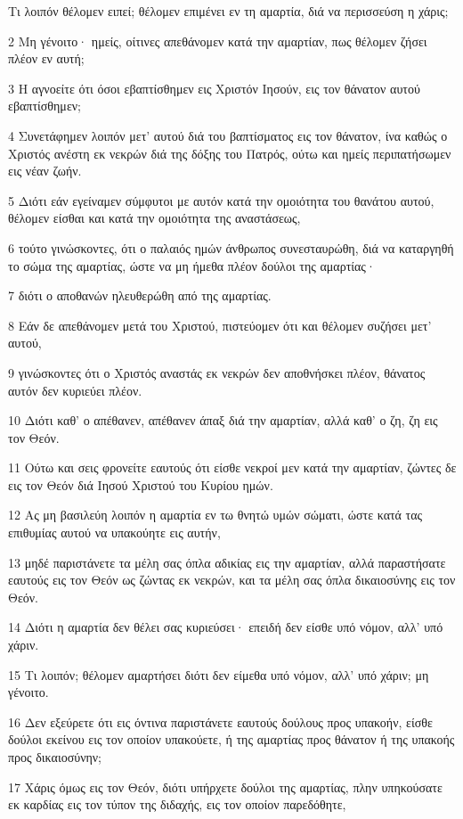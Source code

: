 \par Τι λοιπόν θέλομεν ειπεί; θέλομεν επιμένει εν τη αμαρτία, διά να περισσεύση η χάρις;
\par 2 Μη γένοιτο· ημείς, οίτινες απεθάνομεν κατά την αμαρτίαν, πως θέλομεν ζήσει πλέον εν αυτή;
\par 3 Η αγνοείτε ότι όσοι εβαπτίσθημεν εις Χριστόν Ιησούν, εις τον θάνατον αυτού εβαπτίσθημεν;
\par 4 Συνετάφημεν λοιπόν μετ' αυτού διά του βαπτίσματος εις τον θάνατον, ίνα καθώς ο Χριστός ανέστη εκ νεκρών διά της δόξης του Πατρός, ούτω και ημείς περιπατήσωμεν εις νέαν ζωήν.
\par 5 Διότι εάν εγείναμεν σύμφυτοι με αυτόν κατά την ομοιότητα του θανάτου αυτού, θέλομεν είσθαι και κατά την ομοιότητα της αναστάσεως,
\par 6 τούτο γινώσκοντες, ότι ο παλαιός ημών άνθρωπος συνεσταυρώθη, διά να καταργηθή το σώμα της αμαρτίας, ώστε να μη ήμεθα πλέον δούλοι της αμαρτίας·
\par 7 διότι ο αποθανών ηλευθερώθη από της αμαρτίας.
\par 8 Εάν δε απεθάνομεν μετά του Χριστού, πιστεύομεν ότι και θέλομεν συζήσει μετ' αυτού,
\par 9 γινώσκοντες ότι ο Χριστός αναστάς εκ νεκρών δεν αποθνήσκει πλέον, θάνατος αυτόν δεν κυριεύει πλέον.
\par 10 Διότι καθ' ο απέθανεν, απέθανεν άπαξ διά την αμαρτίαν, αλλά καθ' ο ζη, ζη εις τον Θεόν.
\par 11 Ούτω και σεις φρονείτε εαυτούς ότι είσθε νεκροί μεν κατά την αμαρτίαν, ζώντες δε εις τον Θεόν διά Ιησού Χριστού του Κυρίου ημών.
\par 12 Ας μη βασιλεύη λοιπόν η αμαρτία εν τω θνητώ υμών σώματι, ώστε κατά τας επιθυμίας αυτού να υπακούητε εις αυτήν,
\par 13 μηδέ παριστάνετε τα μέλη σας όπλα αδικίας εις την αμαρτίαν, αλλά παραστήσατε εαυτούς εις τον Θεόν ως ζώντας εκ νεκρών, και τα μέλη σας όπλα δικαιοσύνης εις τον Θεόν.
\par 14 Διότι η αμαρτία δεν θέλει σας κυριεύσει· επειδή δεν είσθε υπό νόμον, αλλ' υπό χάριν.
\par 15 Τι λοιπόν; θέλομεν αμαρτήσει διότι δεν είμεθα υπό νόμον, αλλ' υπό χάριν; μη γένοιτο.
\par 16 Δεν εξεύρετε ότι εις όντινα παριστάνετε εαυτούς δούλους προς υπακοήν, είσθε δούλοι εκείνου εις τον οποίον υπακούετε, ή της αμαρτίας προς θάνατον ή της υπακοής προς δικαιοσύνην;
\par 17 Χάρις όμως εις τον Θεόν, διότι υπήρχετε δούλοι της αμαρτίας, πλην υπηκούσατε εκ καρδίας εις τον τύπον της διδαχής, εις τον οποίον παρεδόθητε,
